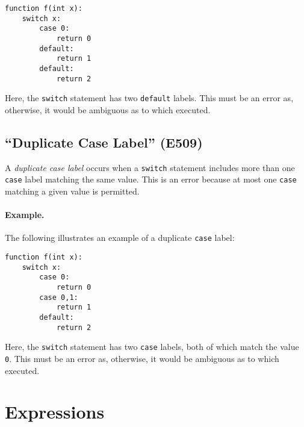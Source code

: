 \begin{lstlisting}
function f(int x):
    switch x:
        case 0:
            return 0
        default:
            return 1
        default:
            return 2
\end{lstlisting}

Here, the \lstinline{switch} statement has two \lstinline{default} labels.  This must be an error as, otherwise, it would be ambiguous as to which executed.

\subsection{``Duplicate Case Label'' (E509)}
A {\em duplicate case label} occurs when a \lstinline{switch} statement includes more than one \lstinline{case} label matching the same value.  This is an error because at most one \lstinline{case} matching a given value is permitted.

\paragraph{Example.}  The following illustrates an example of a duplicate \lstinline{case} label:

\begin{lstlisting}
function f(int x):
    switch x:
        case 0:
            return 0
        case 0,1:
            return 1
        default:
            return 2
\end{lstlisting}

Here, the \lstinline{switch} statement has two \lstinline{case} labels, both of which match the value \lstinline{0}.  This must be an error as, otherwise, it would be ambiguous as to which executed.


\section{Expressions}





